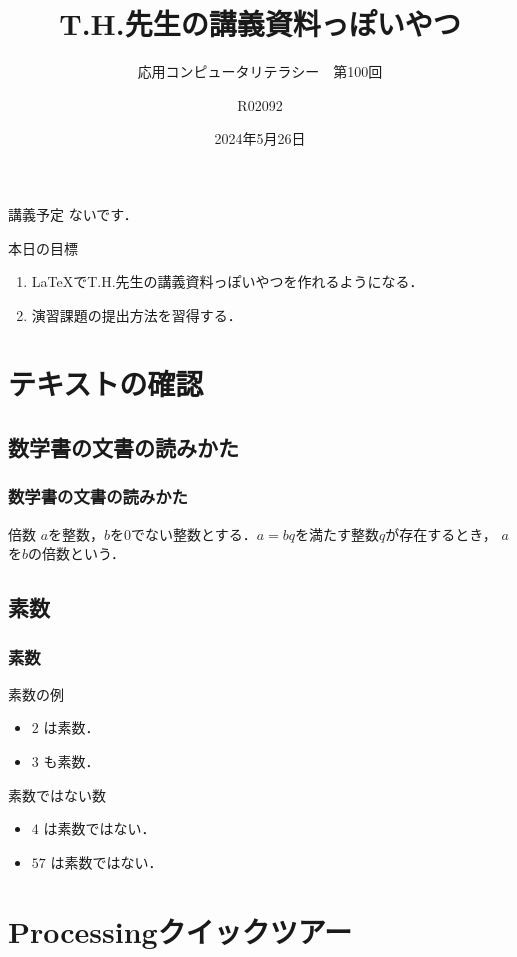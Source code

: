 \documentclass[10pt,unicode]{beamer}
\title{T.H.先生の講義資料っぽいやつ}
\subtitle{応用コンピュータリテラシー　第100回}
\author{R02092\inst{1}}
\institute{\inst{1}高知工科大学　情報学群　学生}
\date{2024年5月26日}
\begin{document}
	\begin{frame}[plain]
		\titlepage
	\end{frame}
	\begin{frame}{講義予定}
		ないです．
	\end{frame}
	\begin{frame}{本日の目標}
		\begin{enumerate}
			\item \LaTeX でT.H.先生の講義資料っぽいやつを作れるようになる．
			\item 演習課題の提出方法を習得する．
		\end{enumerate}
	\end{frame}
	\section{テキストの確認}
	\subsection{数学書の文書の読みかた}
	\begin{frame}
		\frametitle{数学書の文書の読みかた}
		\begin{block}{倍数}
			$a$を整数，$b$を$0$でない整数とする．$a=bq$を満たす整数$q$が存在するとき，
			$a$を$b$の倍数という．
		\end{block}
	\end{frame}
	\subsection{素数}
	\begin{frame}
		\frametitle{素数}
		\begin{exampleblock}{素数の例}
			\begin{itemize}
				\item $2$ は素数．
				\item $3$ も素数．
			\end{itemize}
		\end{exampleblock}
		\begin{alertblock}{素数ではない数}
			\begin{itemize}
				\item $4$ は素数ではない．
				\item $57$ は素数ではない．
			\end{itemize}
		\end{alertblock}
	\end{frame}
	\section{Processingクイックツアー}
\end{document}
